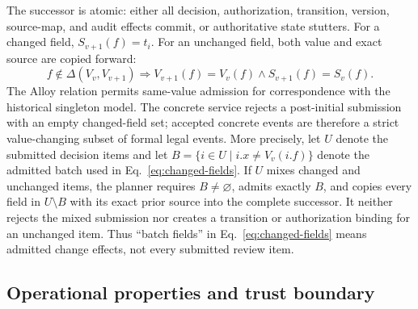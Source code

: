 The successor is atomic: either all decision, authorization, transition, version, source-map, and audit effects commit, or authoritative state stutters. For a changed field, $S_{v+1}(f)=t_i$. For an unchanged field, both value and exact source are copied forward:
\begin{equation}
f\notin\Delta(V_v,V_{v+1})\Rightarrow
V_{v+1}(f)=V_v(f)\land S_{v+1}(f)=S_v(f).
\label{eq:copy-forward}
\end{equation}
The Alloy relation permits same-value admission for correspondence with the historical singleton model. The concrete service rejects a post-initial submission with an empty changed-field set; accepted concrete events are therefore a strict value-changing subset of formal legal events. More precisely, let $U$ denote the submitted decision items and let $B=\{i\in U\mid i.x\neq V_v(i.f)\}$ denote the admitted batch used in Eq.~\eqref{eq:changed-fields}. If $U$ mixes changed and unchanged items, the planner requires $B\neq\varnothing$, admits exactly $B$, and copies every field in $U\setminus B$ with its exact prior source into the complete successor. It neither rejects the mixed submission nor creates a transition or authorization binding for an unchanged item. Thus ``batch fields'' in Eq.~\eqref{eq:changed-fields} means admitted change effects, not every submitted review item.

\subsection{Operational properties and trust boundary}

